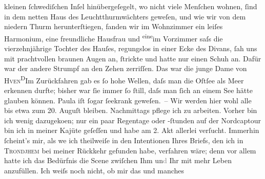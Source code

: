 \begin{ledgroupsized}[t]{13cm}
               kleinen ſchwe{\pb}diſchen Inſel hinübergeſegelt, wo nicht viele
               Menſchen wohnen, ſind in dem netten Haus des Leuchtthurmwächters geweſen, und wie wir von dem niedern
               Thurm herunterſtiegen, fanden wir im Wohnzimmer ein leiſes Harmonium, eine
               freundliche Hausfrau und \substVorne{}\textsuperscript{eine}\substDazwischen{}im\substHinten{} Vorzimmer saſs die vierzehnjährige Tochter des Hauſes, regungslos in einer Ecke des Divans,
               ſah uns mit prachtvollen braunen Augen an, {\pb}ſtrickte und
               hatte nur einen Schuh an. Dafür war der andere Strumpf an den Zehen zerriſſen. Das
               war die junge Dame von \textsc{Hven}\substVorne{}\textsuperscript{D}\substDazwischen{}I\substHinten{}m Zurückfahren gab es ſo hohe Wellen, daſs man die Oſtſee als Meer erkennen durfte; bisher war ſie immer ſo
               ſtill, daſs man ſich an einem See hätte glauben können. Paula iſt ſogar ſeekrank geweſen. – Wir werden hier wohl alle
               bis etwa zum 20. Auguſt bleiben. Nachmittags pflege ich zu
               arbeiten. Vorher bin ich {\pb}wenig dazugeko{\geminationm}en; nur ein paar Regentage oder -ſtunden auf der Nordcaptour bin ich in meiner Kajüte geſeſſen
               und habe am 2. Akt allerlei
               verſucht. Immerhin ſcheint’s mir, als we{\geminationn} ich theilweiſe
               in den Intentionen Ihres Briefs, den ich in \textsc{Trondjhem} bei meiner Rückkehr gefunden habe, verfahren wäre; denn vor allem hatte ich das
               Bedürfnis die Scene zwiſchen Ihm un\textcolor{gray}{d} Ihr mit mehr Leben
               anzufüllen. Ich weiſs noch nicht, ob mir das {\pb}und manches

\end{ledgroupsized}
